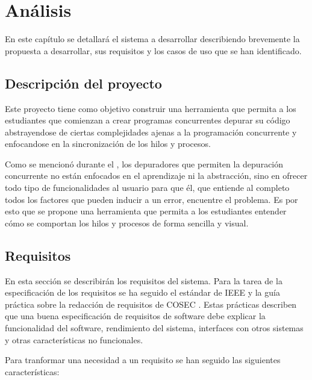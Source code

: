 \chapter{Análisis}\label{chap:analisis}
En este capítulo se detallará el sistema a desarrollar describiendo brevemente la propuesta a desarrollar, sus requisitos y los casos de uso que se han identificado.

\section{Descripción del proyecto}\label{sec:descripcion}
Este proyecto tiene como objetivo construir una herramienta que permita a los estudiantes que comienzan a crear programas concurrentes depurar su código abstrayendose de ciertas complejidades ajenas a la programación concurrente y enfocandose en la sincronización de los hilos y procesos.

Como se mencionó durante el , los depuradores que permiten la depuración concurrente no están enfocados en el aprendizaje ni la abstracción, sino en ofrecer todo tipo de funcionalidades al usuario para que él, que entiende al completo todos los factores que pueden inducir a un error, encuentre el problema. Es por esto que se propone una herramienta que permita a los estudiantes entender cómo se comportan los hilos y procesos de forma sencilla y visual.

\section{Requisitos}\label{sec:requisitos}

En esta sección se describirán los requisitos del sistema. Para la tarea de la especificación de los requisitos se ha seguido el estándar de IEEE \cite{IEEE-Requirements} y la guía práctica sobre la redacción de requisitos de COSEC \cite{INCOSE-Requirements}. Estas prácticas describen que una buena especificación de requisitos de software debe explicar la funcionalidad del software, rendimiento del sistema, interfaces con otros sistemas y otras características no funcionales.

Para tranformar una necesidad a un requisito se han seguido las siguientes características:

